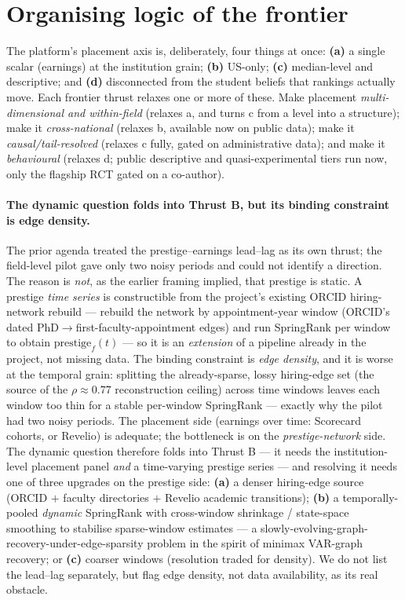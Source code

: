 \documentclass[11pt]{article}
\begin{document}
\section{Organising logic of the frontier}\label{sec:logic}
The platform's placement axis is, deliberately, four things at once: \textbf{(a)} a single scalar (earnings) at the
institution grain; \textbf{(b)} US-only; \textbf{(c)} median-level and descriptive; and \textbf{(d)} disconnected
from the student beliefs that rankings actually move. Each frontier thrust relaxes one or more of these. Make
placement \emph{multi-dimensional and within-field} (relaxes a, and turns c from a level into a structure);
make it \emph{cross-national} (relaxes b, available now on public data); make it \emph{causal/tail-resolved}
(relaxes c fully, gated on administrative data); and make it \emph{behavioural} (relaxes d; public descriptive and
quasi-experimental tiers run now, only the flagship RCT gated on a co-author).

\paragraph{The dynamic question folds into Thrust B, but its binding constraint is edge density.} The prior agenda
treated the prestige--earnings lead--lag as its own thrust; the field-level pilot gave only two noisy periods and
could not identify a direction. The reason is \emph{not}, as the earlier framing implied, that prestige is static.
A prestige \emph{time series} is constructible from the project's existing ORCID hiring-network rebuild --- rebuild
the network by appointment-year window (ORCID's dated PhD$\to$first-faculty-appointment edges) and run SpringRank
per window to obtain $\text{prestige}_f(t)$ --- so it is an \emph{extension} of a pipeline already in the project,
not missing data. The binding constraint is \emph{edge density}, and it is worse at the temporal grain: splitting
the already-sparse, lossy hiring-edge set (the source of the $\rho\approx0.77$ reconstruction ceiling) across time
windows leaves each window too thin for a stable per-window SpringRank --- exactly why the pilot had two noisy
periods. The placement side (earnings over time: Scorecard cohorts, or Revelio) is adequate; the bottleneck is on
the \emph{prestige-network} side. The dynamic question therefore folds into Thrust B --- it needs the
institution-level placement panel \emph{and} a time-varying prestige series --- and resolving it needs one of three
upgrades on the prestige side: \textbf{(a)} a denser hiring-edge source (ORCID $+$ faculty directories $+$ Revelio
academic transitions); \textbf{(b)} a temporally-pooled \emph{dynamic} SpringRank with cross-window shrinkage /
state-space smoothing to stabilise sparse-window estimates --- a slowly-evolving-graph-recovery-under-edge-sparsity
problem in the spirit of minimax VAR-graph recovery; or \textbf{(c)} coarser windows (resolution traded for
density). We do not list the lead--lag separately, but flag edge density, not data availability, as its real
obstacle.
\end{document}
